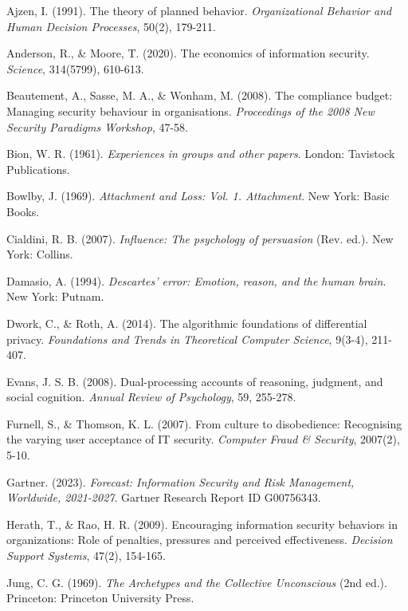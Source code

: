 \documentclass[11pt,a4paper]{article}
\begin{document}
\begin{thebibliography}{99}

Ajzen, I. (1991). The theory of planned behavior. \textit{Organizational Behavior and Human Decision Processes}, 50(2), 179-211.

Anderson, R., \& Moore, T. (2020). The economics of information security. \textit{Science}, 314(5799), 610-613.

Beautement, A., Sasse, M. A., \& Wonham, M. (2008). The compliance budget: Managing security behaviour in organisations. \textit{Proceedings of the 2008 New Security Paradigms Workshop}, 47-58.

Bion, W. R. (1961). \textit{Experiences in groups and other papers}. London: Tavistock Publications.

Bowlby, J. (1969). \textit{Attachment and Loss: Vol. 1. Attachment}. New York: Basic Books.

Cialdini, R. B. (2007). \textit{Influence: The psychology of persuasion} (Rev. ed.). New York: Collins.

Damasio, A. (1994). \textit{Descartes' error: Emotion, reason, and the human brain}. New York: Putnam.

Dwork, C., \& Roth, A. (2014). The algorithmic foundations of differential privacy. \textit{Foundations and Trends in Theoretical Computer Science}, 9(3-4), 211-407.

Evans, J. S. B. (2008). Dual-processing accounts of reasoning, judgment, and social cognition. \textit{Annual Review of Psychology}, 59, 255-278.

Furnell, S., \& Thomson, K. L. (2007). From culture to disobedience: Recognising the varying user acceptance of IT security. \textit{Computer Fraud \& Security}, 2007(2), 5-10.

Gartner. (2023). \textit{Forecast: Information Security and Risk Management, Worldwide, 2021-2027}. Gartner Research Report ID G00756343.

Herath, T., \& Rao, H. R. (2009). Encouraging information security behaviors in organizations: Role of penalties, pressures and perceived effectiveness. \textit{Decision Support Systems}, 47(2), 154-165.

Jung, C. G. (1969). \textit{The Archetypes and the Collective Unconscious} (2nd ed.). Princeton: Princeton University Press.


\end{thebibliography}
\end{document}
